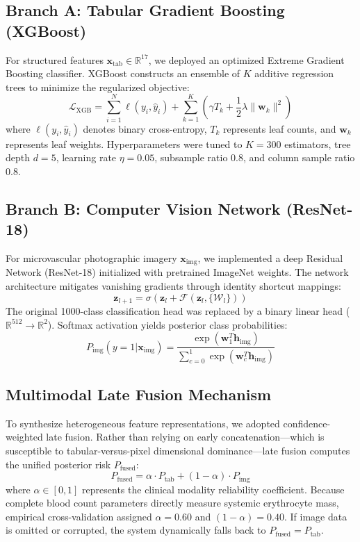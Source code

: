 \documentclass[journal,10pt,twocolumn]{IEEEtran}
\begin{document}
\subsection{Branch A: Tabular Gradient Boosting (XGBoost)}
For structured features $\mathbf{x}_{\text{tab}} \in \mathbb{R}^{17}$, we deployed an optimized Extreme Gradient Boosting classifier. XGBoost constructs an ensemble of $K$ additive regression trees to minimize the regularized objective:
\begin{equation}
\mathcal{L}_{\text{XGB}} = \sum_{i=1}^{N} \ell(y_i, \hat{y}_i) + \sum_{k=1}^{K} \left( \gamma T_k + \frac{1}{2} \lambda \|\mathbf{w}_k\|^2 \right)
\end{equation}
where $\ell(y_i, \hat{y}_i)$ denotes binary cross-entropy, $T_k$ represents leaf counts, and $\mathbf{w}_k$ represents leaf weights. Hyperparameters were tuned to $K=300$ estimators, tree depth $d=5$, learning rate $\eta=0.05$, subsample ratio $0.8$, and column sample ratio $0.8$.

\subsection{Branch B: Computer Vision Network (ResNet-18)}
For microvascular photographic imagery $\mathbf{x}_{\text{img}}$, we implemented a deep Residual Network (ResNet-18) initialized with pretrained ImageNet weights. The network architecture mitigates vanishing gradients through identity shortcut mappings:
\begin{equation}
\mathbf{z}_{l+1} = \sigma\left( \mathbf{z}_l + \mathcal{F}(\mathbf{z}_l, \{\mathcal{W}_l\}) \right)
\end{equation}
The original 1000-class classification head was replaced by a binary linear head ($\mathbb{R}^{512} \to \mathbb{R}^2$). Softmax activation yields posterior class probabilities:
\begin{equation}
P_{\text{img}}(y=1 | \mathbf{x}_{\text{img}}) = \frac{\exp(\mathbf{w}_1^T \mathbf{h}_{\text{img}})}{\sum_{c=0}^1 \exp(\mathbf{w}_c^T \mathbf{h}_{\text{img}})}
\end{equation}

\subsection{Multimodal Late Fusion Mechanism}
To synthesize heterogeneous feature representations, we adopted confidence-weighted late fusion. Rather than relying on early concatenation—which is susceptible to tabular-versus-pixel dimensional dominance—late fusion computes the unified posterior risk $P_{\text{fused}}$:
\begin{equation}
P_{\text{fused}} = \alpha \cdot P_{\text{tab}} + (1 - \alpha) \cdot P_{\text{img}}
\end{equation}
where $\alpha \in [0, 1]$ represents the clinical modality reliability coefficient. Because complete blood count parameters directly measure systemic erythrocyte mass, empirical cross-validation assigned $\alpha = 0.60$ and $(1-\alpha) = 0.40$. If image data is omitted or corrupted, the system dynamically falls back to $P_{\text{fused}} = P_{\text{tab}}$.
\end{document}
